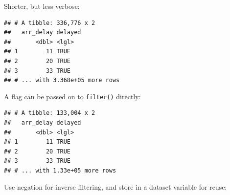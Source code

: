 \documentclass[]{book}
\newenvironment{Shaded}{}{}
\newcommand{\DataTypeTok}[1]{#1}
\newcommand{\DecValTok}[1]{#1}
\newcommand{\KeywordTok}[1]{\textcolor[rgb]{0.00,0.00,1.00}{#1}}
\newcommand{\NormalTok}[1]{#1}
\newcommand{\OperatorTok}[1]{#1}
\newcommand{\StringTok}[1]{\textcolor[rgb]{0.00,0.50,0.50}{#1}}
\begin{document}
Shorter, but less verbose:

\begin{Shaded}
\end{Shaded}

\begin{verbatim}
## # A tibble: 336,776 x 2
##   arr_delay delayed
##       <dbl> <lgl>  
## 1        11 TRUE   
## 2        20 TRUE   
## 3        33 TRUE   
## # ... with 3.368e+05 more rows
\end{verbatim}

A flag can be passed on to \texttt{filter()} directly:

\begin{Shaded}
\end{Shaded}

\begin{verbatim}
## # A tibble: 133,004 x 2
##   arr_delay delayed
##       <dbl> <lgl>  
## 1        11 TRUE   
## 2        20 TRUE   
## 3        33 TRUE   
## # ... with 1.33e+05 more rows
\end{verbatim}

Use negation for inverse filtering, and store in a dataset variable for reuse:

\begin{Shaded}
\end{Shaded}
\end{document}
